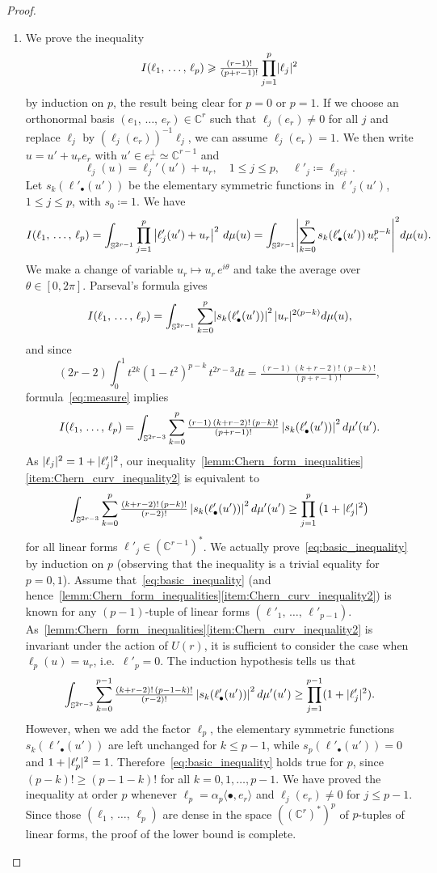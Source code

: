 \documentclass[10pt,a4paper]{article}
\DeclarePairedDelimiter{\abs}{\lvert}{\rvert}
\newcommand*\bC{\mathbb{C}}
\newcommand*\bS{\mathbb{S}}
\let\leq\leqslant
\let\geq\geqslant
\newcommand*\bydef{\coloneqq}
\numberwithin{equation}{section}
\begin{document}
\begin{proof}
\begin{enumerate}
\item We prove the inequality
\[
I(\ell_1,\,\dotsc,\,\ell_p)\geq \tfrac{(r-1)!}{(p+r-1)!}\prod_{j=1}^p\abs{\ell_j}^2
\]
by induction on $p$, the result being clear for $p=0$ or $p=1$. If we choose an orthonormal basis $(e_1,\,\dotsc,\,e_r)\in\bC^r$ such that
$\ell_j(e_r)\ne 0$ for all $j$ and replace $\ell_j$ by
$(\ell_j(e_r))^{-1}\ell_j$, we can assume $\ell_j(e_r)=1$. We then write $u=u'+u_re_r$ with $u'\in e_r^\perp\simeq\bC^{r-1}$ and
\[
\ell_j(u)=\ell_j'(u')+u_r,\quad 1\leq j\leq p,\quad\ell'_j
\bydef
\ell_{j|e_r^\perp}.
\]
Let $s_k(\ell'_\bullet(u'))$ be the elementary symmetric functions in $\ell'_j(u')$, $1\leq j\leq p$, with $s_0\bydef1$. We have
\[
I(\ell_1,\,\dotsc,\,\ell_p) =\int_{\bS^{2r-1}}\prod_{j=1}^p\left|\ell'_j(u')+u_r\right|^2\,d\mu(u) =\int_{\bS^{2r-1}}
\abs*{\sum_{k=0}^ps_k(\ell'_\bullet(u'))\,u_r^{p-k}}^2 d\mu(u).
\]
We make a change of variable $u_r\mapsto u_r\,e^{i\theta}$ and take the average over $\theta\in[0,2\pi]$. Parseval's formula gives
\[
I(\ell_1,\,\dotsc,\,\ell_p) =\int_{\bS^{2r-1}}\sum_{k=0}^p\abs*{s_k(\ell'_\bullet(u'))}^2\,\abs{u_r}^{2(p-k)} d\mu(u),
\]
and since
\[
(2r-2)\int_0^1t^{2k}(1-t^2)^{p-k}\,t^{2r-3}dt=
\tfrac{(r-1)\,(k+r-2)!\,(p-k)!}{(p+r-1)!},
\]
formula~\eqref{eq:measure} implies
\[
I(\ell_1,\,\dotsc,\,\ell_p) =\int_{\bS^{2r-3}}\sum_{k=0}^p\tfrac{(r-1)\,(k+r-2)!\,(p-k)!}{(p+r-1)!}\,
\abs*{s_k(\ell'_\bullet(u'))}^2\,d\mu'(u').
\]
As $\abs{\ell_j}^2=1+\abs{\ell'_j}^2$, our inequality~\ref{lemm:Chern_form_inequalities}\eqref{item:Chern_curv_inequality2} is equivalent to
\begin{equation}\label{eq:basic_inequality}
\int_{\bS^{2r-3}}\sum_{k=0}^p\tfrac{(k+r-2)!\,(p-k)!}{(r-2)!}\,
\abs*{s_k(\ell'_\bullet(u'))}^2\,d\mu'(u')\ge
\prod_{j=1}^p\left(1+\abs{\ell'_j}^2\right)
\end{equation}
for all linear forms $\ell'_j\in(\bC^{r-1})^*$. We actually prove~\eqref{eq:basic_inequality} by induction on $p$ (observing that the inequality is a trivial equality for $p=0,1$). Assume that~\eqref{eq:basic_inequality} (and hence~\ref{lemm:Chern_form_inequalities}\eqref{item:Chern_curv_inequality2}) is known for any $(p-1)$-tuple of linear forms $(\ell'_1,\,\dotsc,\,\ell'_{p-1})$. As~\ref{lemm:Chern_form_inequalities}\eqref{item:Chern_curv_inequality2} is invariant under the action of $U(r)$, it is sufficient to consider the case when $\ell_p(u)=u_r$, i.e.\ $\ell'_p=0$. The induction hypothesis tells us that
\[
\int_{\bS^{2r-3}}\sum_{k=0}^{p-1}\tfrac{(k+r-2)!\,(p-1-k)!}{(r-2)!}\,
\abs*{s_k(\ell'_\bullet(u'))}^2\,d\mu'(u')\ge
\prod_{j=1}^{p-1}(1+\abs{\ell'_j}^2).
\]
However, when we add the factor $\ell_p$, the elementary symmetric functions $s_k(\ell'_\bullet(u'))$ are left unchanged for $k\leq p-1$, while
$s_p(\ell'_\bullet(u'))=0$ and $1+\abs{\ell'_p}^2=1$. Therefore~\eqref{eq:basic_inequality} holds true for $p$, since $(p-k)!\geq (p-1-k)!$ for all $k=0,1,\dotsc,p-1$. We have proved the inequality at order $p$ whenever
$\ell_p=\alpha_p\langle\bullet,e_r\rangle$ and $\ell_j(e_r)\ne 0$ for $j\leq p-1$. Since those $(\ell_1,\,\dotsc,\,\ell_p)$ are dense in the space $((\bC^r)^*)^p$ of $p$-tuples of linear forms, the proof of the lower bound is complete.


\end{enumerate}
\end{proof}
\end{document}
